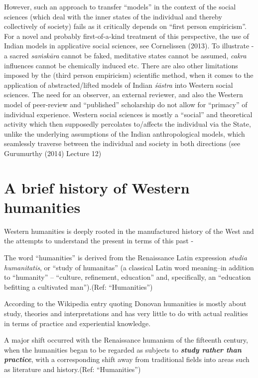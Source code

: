 However, such an approach to transfer ``models'' in the context of the social sciences (which deal with the inner states of the individual and thereby collectively of society) fails as it critically depends on ``first person empiricism''. For a novel and probably first-of-a-kind treatment of this perspective, the use of Indian models in applicative social sciences, see Cornelissen (2013). To illustrate - a sacred {\sl saṁskāra} cannot be faked, meditative states cannot be assumed, {\sl cakra} influences cannot be chemically induced etc. There are also other limitations imposed by the (third person empiricism) scientific method, when it comes to the application of abstracted/lifted models of Indian {\sl śāstra} into Western social sciences. The need for an observer, an external reviewer, and also the Western model of peer-review and ``published'' scholarship do not allow for ``primacy'' of individual experience. Western social sciences is mostly a ``social'' and theoretical activity which then supposedly percolates to/affects the individual via the State, unlike the underlying assumptions of the Indian anthropological models, which seamlessly traverse between the individual and society in both directions (see Gurumurthy (2014) Lecture 12)

\section*{A brief history of Western humanities}

Western humanities is deeply rooted in the manufactured history of the West and the attempts to understand the present in terms of this past -
\begin{myquote}
The word ``humanities'' is derived from the Renaissance Latin expression {\sl studia humanitatis}, or ``study of humanitas'' (a classical Latin word meaning--in addition to ``humanity'' -- ``culture, refinement, education'' and, specifically, an ``education befitting a cultivated man'').\hfill (Ref: ``Humanities'')
\end{myquote}

According to the Wikipedia entry quoting Donovan humanities is mostly about study, theories and interpretations and has very little to do with actual realities in terms of practice and experiential knowledge.
\begin{myquote}
A major shift occurred with the Renaissance humanism of the fifteenth century, when the humanities began to be regarded as subjects to {{\sl\bfseries study rather than practice}\relax}, with a corresponding shift away from traditional fields into areas such as literature and history.\hfill (Ref: ``Humanities'')
\end{myquote}

